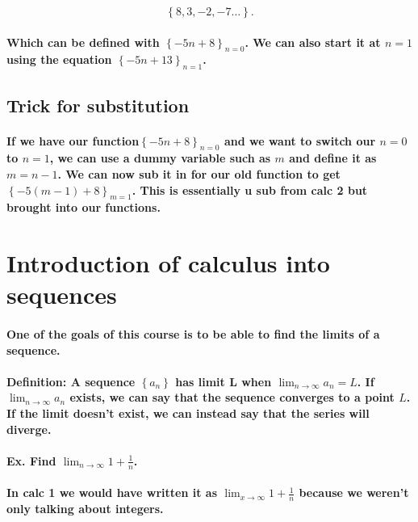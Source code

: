 \[
\left\{8,3,-2,-7 \ldots \right\}
.\] 

\paragraph{Which can be defined with $\left\{-5n+8\right\}_{n=0}$. We can also start it at $n=1$ using the equation $\left\{-5n+13\right\}_{n=1}$.}

\subsection{Trick for substitution}%
\label{sub:Trick for substitution}

\paragraph{If we have our function$\left\{-5n+8\right\}_{n=0}$ and we want to switch our $n=0$ to $n=1$, we can use a dummy variable such as $m$ and define it as $m=n-1$. We can now sub it in for our old function to get $\left\{-5\left( m-1 \right) +8\right\}_{m=1}$. This is essentially u sub from calc 2 but brought into our functions.  }

\section{Introduction of calculus into sequences}%
\label{sec:Introduction of calculus into sequences}
\paragraph{One of the goals of this course is to be able to find the limits of a sequence. }
\paragraph{Definition: A sequence $\left\{a_{n}\right\}$ has limit L when $\lim_{n \to \infty} a_n = L$. If $\lim_{n \to \infty} a_n$ exists, we can say that the sequence converges to a point $L$. If the limit doesn't exist, we can instead say that the series will diverge. }

\paragraph{Ex. Find $\lim_{n \to \infty} 1+\frac{1}{n}$.}

\paragraph{In calc 1 we would have written it as $\lim_{x \to \infty} 1+\frac{1}{n}$ because we weren't only talking about integers. }

